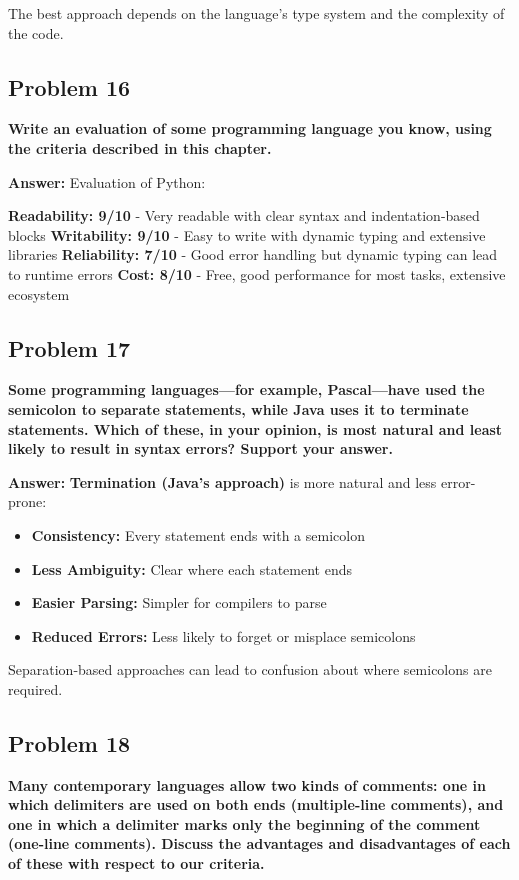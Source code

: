 \documentclass[11pt,a4paper]{article}
\begin{document}
The best approach depends on the language's type system and the complexity of the code.

\subsection{Problem 16}
\textbf{Write an evaluation of some programming language you know, using the criteria described in this chapter.}

\textbf{Answer:}
Evaluation of Python:

\textbf{Readability: 9/10} - Very readable with clear syntax and indentation-based blocks
\textbf{Writability: 9/10} - Easy to write with dynamic typing and extensive libraries
\textbf{Reliability: 7/10} - Good error handling but dynamic typing can lead to runtime errors
\textbf{Cost: 8/10} - Free, good performance for most tasks, extensive ecosystem

\subsection{Problem 17}
\textbf{Some programming languages—for example, Pascal—have used the semicolon to separate statements, while Java uses it to terminate statements. Which of these, in your opinion, is most natural and least likely to result in syntax errors? Support your answer.}

\textbf{Answer:}
\textbf{Termination (Java's approach)} is more natural and less error-prone:

\begin{itemize}
\item \textbf{Consistency:} Every statement ends with a semicolon
\item \textbf{Less Ambiguity:} Clear where each statement ends
\item \textbf{Easier Parsing:} Simpler for compilers to parse
\item \textbf{Reduced Errors:} Less likely to forget or misplace semicolons
\end{itemize}

Separation-based approaches can lead to confusion about where semicolons are required.

\subsection{Problem 18}
\textbf{Many contemporary languages allow two kinds of comments: one in which delimiters are used on both ends (multiple-line comments), and one in which a delimiter marks only the beginning of the comment (one-line comments). Discuss the advantages and disadvantages of each of these with respect to our criteria.}
\end{document}
